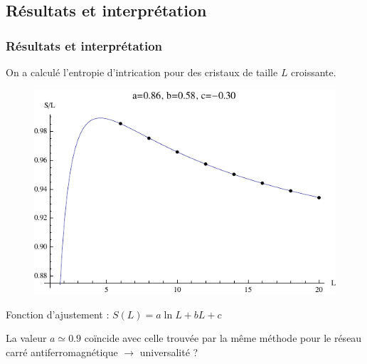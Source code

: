 \documentclass[xcolor=dvipsnames]{beamer}
\newcommand{\1}{\ensuremath{\ket{\om_1\bom_1}}\xspace}
\newcommand{\2}{\ensuremath{\ket{\om_2\bom_2}}\xspace}
\begin{document}
\subsection{Résultats et interprétation}
\begin{frame}
\frametitle{Résultats et interprétation}
On a calculé l'entropie d'intrication pour des cristaux de taille $L$ croissante.
\begin{figure}[htp]
\centering
\includegraphics[scale=0.50]{vector_img/ent.pdf}
\end{figure}
Fonction d'ajustement : $S(L)=a\ln L +bL+c$

La valeur $a \simeq 0.9$ coïncide avec celle trouvée par la même méthode pour le réseau carré antiferromagnétique $ \rightarrow$ universalité ?
\end{frame}
\end{document}
